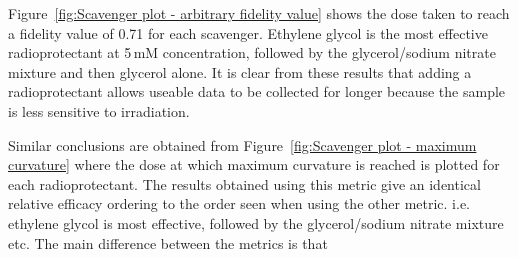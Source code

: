 Figure~\ref{fig:Scavenger plot - arbitrary fidelity value} shows the dose taken to reach a fidelity value of 0.71 for each scavenger.
Ethylene glycol is the most effective radioprotectant at 5$\,$mM concentration, followed by the glycerol/sodium nitrate mixture and then glycerol alone.
It is clear from these results that adding a radioprotectant allows useable data to be collected for longer because the sample is less sensitive to irradiation.

Similar conclusions are obtained from Figure~\ref{fig:Scavenger plot - maximum curvature} where the dose at which maximum curvature is reached is plotted for each radioprotectant.
The results obtained using this metric give an identical relative efficacy ordering to the order seen when using the other metric. i.e. ethylene glycol is most effective, followed by the glycerol/sodium nitrate mixture etc.
The main difference between the metrics is that
